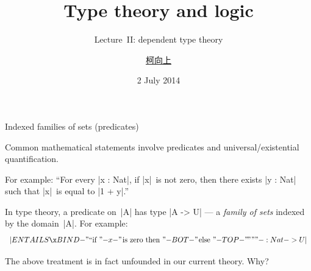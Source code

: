 \documentclass[t,compress,hyperref={hidelinks}]{beamer}
\newcommand{\lectureno}{II}
\begin{document}

\title{Type theory and logic}
\subtitle{Lecture~\lectureno: dependent type theory}
\date{2 July 2014}
\author{{\href{http://www.cs.ox.ac.uk/people/hsiang-shang.ko/}{柯向上}}}

{
\begin{frame}
\titlepage
\end{frame}}

\begin{frame}{Indexed families of sets (predicates)}

Common mathematical statements involve predicates and universal/existential quantification.

For example: ``For every |x : Nat|, if |x|~is not zero, then there exists |y : Nat| such that |x|~is equal to |1 + y|.''

In type theory, a predicate on~|A| has type |A -> U| --- a \emph{family of sets} indexed by the domain~|A|.
For example:
\[ |ENTAILS \x BIND {-"\text{``if }"-} x {-"\text{\kern1pt is zero then }"-} BOT {-"\text{\kern1pt else }"-} TOP {-"\text{\kern-.1em''''}"-} : Nat -> U| \]

 The above treatment is in fact unfounded in our current theory. Why?

\end{frame}
\end{document}
